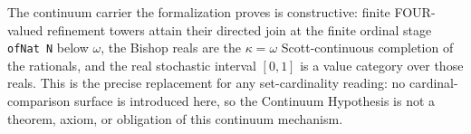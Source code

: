 \begin{theorem}\label{thm:constructive-continuum-colimit-certificate}\leanok{}
The continuum carrier the formalization proves is constructive:
finite FOUR-valued refinement towers attain their directed join at the finite
ordinal stage \texttt{ofNat N} below \(\omega\), the Bishop reals are the
\(\kappa=\omega\) Scott-continuous completion of the rationals, and the real
stochastic interval \([0,1]\) is a value category over those reals.  This is the
precise replacement for any set-cardinality reading: no cardinal-comparison
surface is introduced here, so the Continuum Hypothesis is not a theorem, axiom,
or obligation of this continuum mechanism.
\end{theorem}
